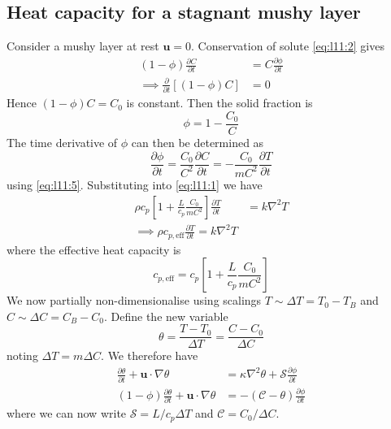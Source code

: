 \documentclass{jknotes}
\renewcommand{\u}{\symbf{u}}
\newcommand{\C}{\mathcal{C}}
\renewcommand{\S}{\mathcal{S}}
\begin{document}
\subsection{Heat capacity for a stagnant mushy layer}
Consider a mushy layer at rest $\u = 0$. Conservation of solute
\eqref{eq:l11:2} gives
\begin{align}
	(1-\phi)\frac{\partial C}{\partial t} &= C\frac{\partial \phi}{\partial t}
	\\
	\implies \frac{\partial}{\partial t}\left[ (1-\phi)C\right] &= 0
\end{align}
Hence $(1-\phi)C = C_0$ is constant. Then the solid fraction is
\begin{equation}
	\phi = 1-\frac{C_0}{C}
\end{equation}
The time derivative of $\phi$ can then be determined as
\begin{equation}
	\frac{\partial \phi}{\partial t} = \frac{C_0}{C^2} \frac{\partial
	C}{\partial t} = -\frac{C_0}{mC^2}\frac{\partial T}{\partial t}
\end{equation}
using \eqref{eq:l11:5}. Substituting into \eqref{eq:l11:1} we have
\begin{align}
	\rho c_p \left[ 1 + \frac{L}{c_p}\frac{C_0}{mC^2}\right] \frac{\partial
	T}{\partial t} &= k\nabla^2 T \\
	\implies \rho c_{p,\text{eff}} \frac{\partial T}{\partial t} = k \nabla^2
	T
\end{align}
where the effective heat capacity is
\begin{equation}
	c_{p,\text{eff}} = c_p \left[ 1 + \frac{L}{c_p} \frac{C_0}{mC^2}\right]
\end{equation}
We now partially non-dimensionalise using scalings $T \sim \Delta T = T_0 -
T_B$ and $C \sim \Delta C = C_B -C_0$. Define the new variable
\begin{equation}
	\theta = \frac{T-T_0}{\Delta T} = \frac{C-C_0}{\Delta C}
\end{equation}
noting $\Delta T = m \Delta C$. We therefore have 
\begin{align}
	\frac{\partial \theta}{\partial t} + \u \cdot \nabla \theta &= \kappa
	\nabla^2 \theta + \S \frac{\partial \phi}{\partial t} \\
	(1-\phi)\frac{\partial \theta}{\partial t} + \u \cdot \nabla \theta &=
	-(\C-\theta)\frac{\partial \phi}{\partial t}
\end{align}
where we can now write $\S = L/c_p \Delta T$ and $\C = C_0/\Delta C$.
\end{document}

